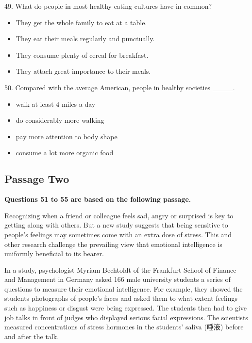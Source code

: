 \documentclass[UTF8,11pt]{ctexart}
\begin{document}
49. What do people in most healthy eating cultures have in common?


\begin{itemize}[leftmargin=2em,itemsep=.2em,topsep=.4em]\item[A.] They get the whole family to eat at a table.
\item[B.] They eat their meals regularly and punctually.
\item[C.] They consume plenty of cereal for breakfast.
\item[D.] They attach great importance to their meals.
\end{itemize}

50. Compared with the average American, people in healthy societies \_\_\_\_.


\begin{itemize}[leftmargin=2em,itemsep=.2em,topsep=.4em]\item[A.] walk at least 4 miles a day
\item[B.] do considerably more walking
\item[C.] pay more attention to body shape
\item[D.] consume a lot more organic food
\end{itemize}

\subsection*{\textbf{Passage Two}}


\textbf{Questions 51 to 55 are based on the following passage.}


Recognizing when a friend or colleague feels sad, angry or surprised is key to getting along with others. But a new study suggests that being sensitive to people's feelings may sometimes come with an extra dose of stress. This and other research challenge the prevailing view that emotional intelligence is uniformly beneficial to its bearer.


In a study, psychologist Myriam Bechtoldt of the Frankfurt School of Finance and Management in Germany asked 166 male university students a series of questions to measure their emotional intelligence. For example, they showed the students photographs of people's faces and asked them to what extent feelings such as happiness or disgust were being expressed. The students then had to give job talks in front of judges who displayed serious facial expressions. The scientists measured concentrations of stress hormones in the students' saliva (唾液) before and after the talk.
\end{document}
